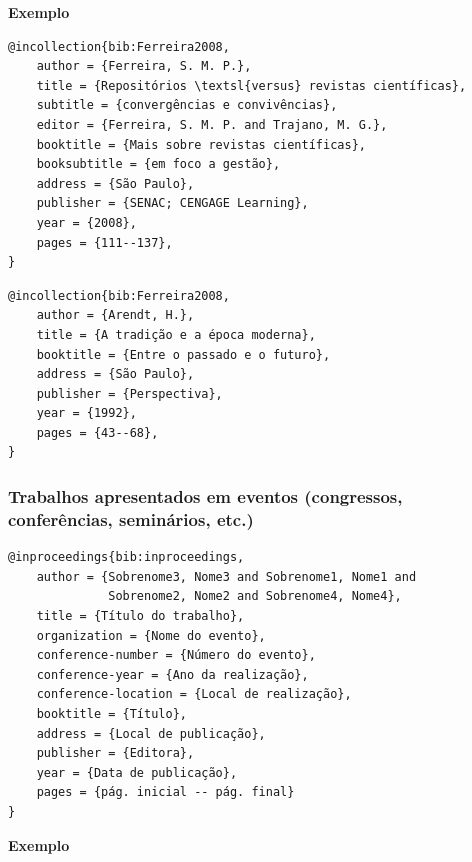 \documentclass[a4paper,12pt,oneside,onecolumn,final,fleqn]{repUERJ}
\begin{document}
\noindent\textbf{Exemplo}\\

\noindent{}

\begin{verbatim}
@incollection{bib:Ferreira2008,
    author = {Ferreira, S. M. P.},
    title = {Repositórios \textsl{versus} revistas científicas},
    subtitle = {convergências e convivências},
    editor = {Ferreira, S. M. P. and Trajano, M. G.},
    booktitle = {Mais sobre revistas científicas},
    booksubtitle = {em foco a gestão},
    address = {São Paulo},
    publisher = {SENAC; CENGAGE Learning},
    year = {2008},
    pages = {111--137},
}
\end{verbatim}

\noindent{}

\begin{verbatim}
@incollection{bib:Ferreira2008,
    author = {Arendt, H.},
    title = {A tradição e a época moderna},
    booktitle = {Entre o passado e o futuro},
    address = {São Paulo},
    publisher = {Perspectiva},
    year = {1992},
    pages = {43--68},
}
\end{verbatim}

\subsubsection{Trabalhos apresentados em eventos (congressos, conferências, seminários, etc.)}

\noindent{}

\begin{verbatim}
@inproceedings{bib:inproceedings,
    author = {Sobrenome3, Nome3 and Sobrenome1, Nome1 and
              Sobrenome2, Nome2 and Sobrenome4, Nome4},
    title = {Título do trabalho},
    organization = {Nome do evento},
    conference-number = {Número do evento},
    conference-year = {Ano da realização},
    conference-location = {Local de realização},
    booktitle = {Título},
    address = {Local de publicação},
    publisher = {Editora},
    year = {Data de publicação},
    pages = {pág. inicial -- pág. final}
}
\end{verbatim}

\noindent\textbf{Exemplo}\\
\end{document}

